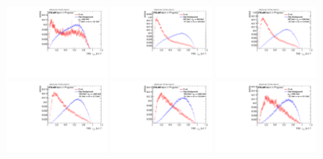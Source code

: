 \begin{figure}
\includegraphics[width=0.3\textwidth]{sascha_input/Appendix/Distributions/top/distributions/beta17/h_assisted_tj_nSub32_17_bin1.pdf} \hspace{1mm}
\includegraphics[width=0.3\textwidth]{sascha_input/Appendix/Distributions/top/distributions/beta17/h_assisted_tj_nSub32_17_bin2.pdf} \hspace{1mm}
\includegraphics[width=0.3\textwidth]{sascha_input/Appendix/Distributions/top/distributions/beta17/h_assisted_tj_nSub32_17_bin3.pdf} 
\bigskip
\includegraphics[width=0.3\textwidth]{sascha_input/Appendix/Distributions/top/distributions/beta17/h_assisted_tj_nSub32_17_bin4.pdf} \hspace{1mm}
\includegraphics[width=0.3\textwidth]{sascha_input/Appendix/Distributions/top/distributions/beta17/h_assisted_tj_nSub32_17_bin5.pdf} \hspace{1mm}
\includegraphics[width=0.3\textwidth]{sascha_input/Appendix/Distributions/top/distributions/beta17/h_assisted_tj_nSub32_17_bin6.pdf} 

\end{figure}
